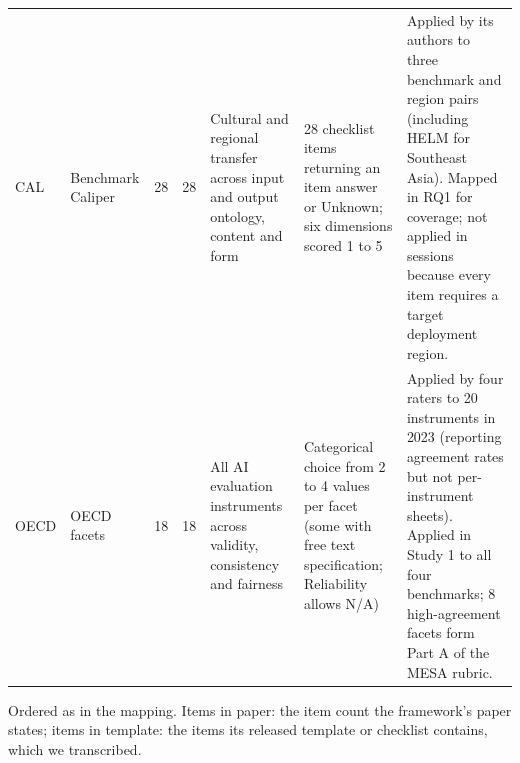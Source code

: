 \documentclass[10pt,conference]{IEEEtran}
\begin{document}
\begin{table}[t]
\begin{tabularx}{\textwidth}{@{}llrrXXX@{}}
CAL & Benchmark Caliper \cite{corona_benchmark_caliper_2026} & 28 & 28 & Cultural and regional transfer across input and output ontology, content and form & 28 checklist items returning an item answer or Unknown; six dimensions scored 1 to 5 & Applied by its authors to three benchmark and region pairs (including HELM for Southeast Asia). Mapped in RQ1 for coverage; not applied in sessions because every item requires a target deployment region. \\
OECD & OECD facets \cite{cohn_hernandez_orallo_oecd_2023} & 18 & 18 & All AI evaluation instruments across validity, consistency and fairness & Categorical choice from 2 to 4 values per facet (some with free text specification; Reliability allows N/A) & Applied by four raters to 20 instruments in 2023 (reporting agreement rates but not per-instrument sheets). Applied in Study 1 to all four benchmarks; 8 high-agreement facets form Part A of the MESA rubric. \\
\bottomrule
\end{tabularx}
\par\vspace{2pt}\raggedright\footnotesize Ordered as in the mapping. Items in paper: the item count the framework's paper states; items in template: the items its released template or checklist contains, which we transcribed.
\end{table}
\end{document}
